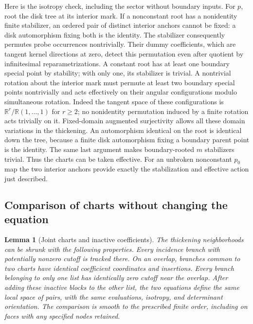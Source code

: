 \documentclass[11pt]{article}
\newtheorem{lemma}[theorem]{Lemma}
\theoremstyle{definition}
\theoremstyle{remark}
\newcommand{\R}{\mathbb R}
\numberwithin{equation}{section}
\begin{document}
Here is the isotropy check, including the sector without boundary inputs.
For $p$, root the disk tree at its interior mark.  If a nonconstant root
has a nonidentity finite stabilizer, an ordered pair of distinct interior
anchors cannot be fixed: a disk automorphism fixing both is the identity.
The stabilizer consequently permutes probe occurrences nontrivially.
Their dummy coefficients, which are tangent kernel directions at zero,
detect this permutation even after quotient by infinitesimal
reparametrizations.  A constant root has at least one boundary special
point by stability; with only one, its stabilizer is trivial.  A
nontrivial rotation about the interior mark must permute at least two
boundary special points nontrivially and acts effectively on their
angular configurations modulo simultaneous rotation.  Indeed the tangent
space of these configurations is $\R^r/\R(1,\ldots,1)$ for $r\ge2$;
no nonidentity permutation induced by a finite rotation acts trivially
on it.  Fixed-domain augmented surjectivity allows all these domain
variations in the thickening.  An automorphism identical on the root is
identical down the tree, because a finite disk automorphism fixing a
boundary parent point is the identity.  The same last argument makes
boundary-rooted $m$ stabilizers trivial.  Thus the charts can be taken
effective.  For an unbroken nonconstant $p_0$ map the two interior anchors
provide exactly the stabilization and effective action just described.

\subsection{Comparison of charts without changing the equation}

\begin{lemma}[Joint charts and inactive coefficients]\label{virt:joint-charts}
The thickening neighborhoods can be shrunk with the following properties.
Every incidence branch with potentially nonzero cutoff is tracked there.
On an overlap, branches common to two charts have identical coefficient
coordinates and insertions.  Every branch belonging to only one list has
identically zero cutoff near the overlap.  After adding these inactive
blocks to the other list, the two equations define the same local space
of pairs, with the same evaluations, isotropy, and determinant orientation.
The comparison is smooth to the prescribed finite order, including on
faces with any specified nodes retained.
\end{lemma}
\end{document}
